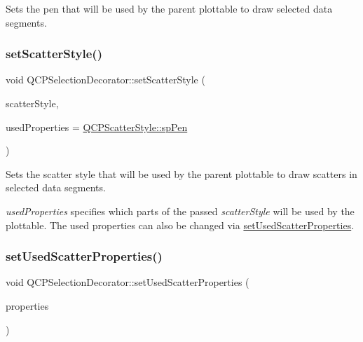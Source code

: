 Sets the pen that will be used by the parent plottable to draw selected data segments. \mbox{\label{class_q_c_p_selection_decorator_ab403a613289714ff4fd4a0c0371ab116}} 
\subsubsection{\texorpdfstring{set\+Scatter\+Style()}{setScatterStyle()}}
{\footnotesize\ttfamily void Q\+C\+P\+Selection\+Decorator\+::set\+Scatter\+Style (\begin{DoxyParamCaption}\item[{const \hyperlink{class_q_c_p_scatter_style}{Q\+C\+P\+Scatter\+Style} \&}]{scatter\+Style,  }\item[{Q\+C\+P\+Scatter\+Style\+::\+Scatter\+Properties}]{used\+Properties = {\ttfamily \hyperlink{class_q_c_p_scatter_style_a8974f6a20f8f6eea7781f0e6af9deb46a1b8f3179d60006d2bcfd4e14a3fcde79}{Q\+C\+P\+Scatter\+Style\+::sp\+Pen}} }\end{DoxyParamCaption})}

Sets the scatter style that will be used by the parent plottable to draw scatters in selected data segments.

{\itshape used\+Properties} specifies which parts of the passed {\itshape scatter\+Style} will be used by the plottable. The used properties can also be changed via \hyperlink{class_q_c_p_selection_decorator_a808c1607cd4e83869c04986e332455c0}{set\+Used\+Scatter\+Properties}. \mbox{\label{class_q_c_p_selection_decorator_a808c1607cd4e83869c04986e332455c0}} 
\subsubsection{\texorpdfstring{set\+Used\+Scatter\+Properties()}{setUsedScatterProperties()}}
{\footnotesize\ttfamily void Q\+C\+P\+Selection\+Decorator\+::set\+Used\+Scatter\+Properties (\begin{DoxyParamCaption}\item[{const Q\+C\+P\+Scatter\+Style\+::\+Scatter\+Properties \&}]{properties }\end{DoxyParamCaption})}

